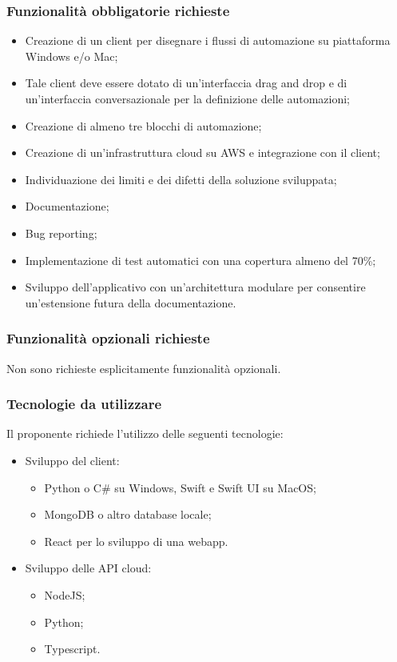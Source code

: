 \documentclass[10pt]{article}
\begin{document}
\subsubsection{Funzionalità obbligatorie richieste}
\begin{itemize}
    \item Creazione di un client per disegnare i flussi di automazione su piattaforma Windows e/o Mac;
    \item Tale client deve essere dotato di un’interfaccia drag and drop e di un’interfaccia conversazionale per la definizione delle automazioni;
    \item Creazione di almeno tre blocchi di automazione;
    \item Creazione di un’infrastruttura cloud su AWS e integrazione con il client;
    \item Individuazione dei limiti e dei difetti della soluzione sviluppata;
    \item Documentazione;
    \item Bug reporting;
    \item Implementazione di test automatici con una copertura almeno del 70\%;
    \item Sviluppo dell’applicativo con un’architettura modulare per consentire un’estensione futura della documentazione.
\end{itemize}
\subsubsection{Funzionalità opzionali richieste}
Non sono richieste esplicitamente funzionalità opzionali.
\subsubsection{Tecnologie da utilizzare}
Il proponente richiede l’utilizzo delle seguenti tecnologie:
\begin{itemize}
    \item Sviluppo del client: 
    \begin{itemize}
        \item Python o C\# su Windows, Swift e Swift UI su MacOS;
        \item MongoDB o altro database locale;
        \item React per lo sviluppo di una webapp.
    \end{itemize}
    \item Sviluppo delle API cloud: 
    \begin{itemize}
        \item NodeJS;
        \item Python;
        \item Typescript.
    \end{itemize}
\end{itemize}
\end{document}
